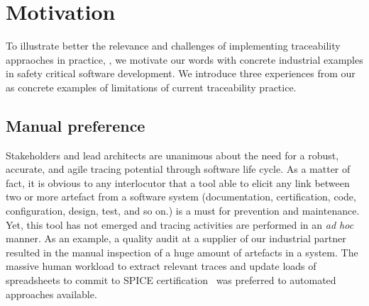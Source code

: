 \section{Motivation}\label{sec:motivation}

To illustrate better the relevance and challenges of implementing traceability appraoches in practice, , we motivate our words with concrete industrial examples in safety critical software development. We introduce three experiences from our  as concrete examples of limitations of current traceability practice.  


\subsection{Manual preference}
Stakeholders and lead architects are unanimous about the need for a robust, accurate, and agile tracing potential through software life cycle. As a matter of fact, it is obvious to any interlocutor that a tool able to elicit any link between two or more artefact from a software system (documentation, certification, code, configuration, design, test, and so on.) is a must for prevention and maintenance. Yet, this tool has not emerged and tracing activities are performed in an \textit{ad hoc} manner. 
As an example, a quality audit at a supplier of our industrial partner resulted in the manual inspection of a huge amount of artefacts in a system. The massive human workload to extract relevant traces and update loads of spreadsheets to commit to SPICE certification~\cite{SPICE-ISO15504} was preferred to automated approaches available. 


